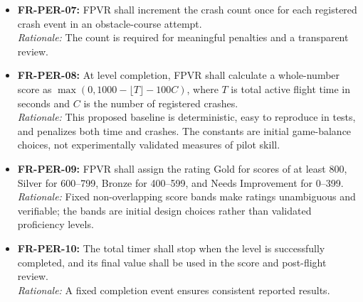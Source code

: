 \documentclass[12pt]{article}
\begin{document}
\begin{itemize}
\textit{Rationale:} Decision time in a menu should not affect flight performance.
\item \hypertarget{req:FR-PER-07}{}\textbf{FR-PER-07:} FPVR shall increment the crash count once for each registered crash event in an obstacle-course attempt.\\
\textit{Rationale:} The count is required for meaningful penalties and a transparent review.
\item \hypertarget{req:FR-PER-08}{}\textbf{FR-PER-08:} At level completion, FPVR shall calculate a whole-number score as $\max(0,1000-\lfloor T\rfloor-100C)$, where $T$ is total active flight time in seconds and $C$ is the number of registered crashes.\\
\textit{Rationale:} This proposed baseline is deterministic, easy to reproduce in tests, and penalizes both time and crashes. The constants are initial game-balance choices, not experimentally validated measures of pilot skill.
\item \hypertarget{req:FR-PER-09}{}\textbf{FR-PER-09:} FPVR shall assign the rating Gold for scores of at least 800, Silver for 600--799, Bronze for 400--599, and Needs Improvement for 0--399.\\
\textit{Rationale:} Fixed non-overlapping score bands make ratings unambiguous and verifiable; the bands are initial design choices rather than validated proficiency levels.
\item \hypertarget{req:FR-PER-10}{}\textbf{FR-PER-10:} The total timer shall stop when the level is successfully completed, and its final value shall be used in the score and post-flight review.\\
\textit{Rationale:} A fixed completion event ensures consistent reported results.
\end{itemize}
\end{document}
